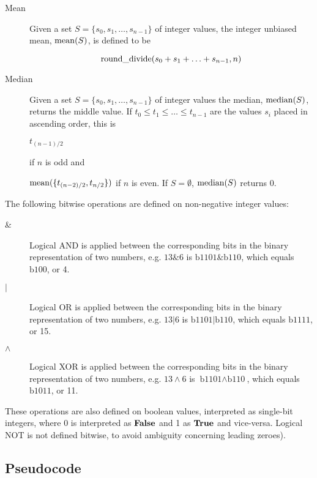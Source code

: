 \begin{description}
\item[Mean] Given a set  $S=\{s_0, s_1, \hdots, s_{n-1}\}$ of integer values, the integer unbiased mean, $\operatorname{mean}(S)$, is defined
to be

\[\operatorname{round\_divide}(s_0+s_1+\hdots +s_{n-1},n)\]

\item[Median] Given a set $S=\{s_0, s_1, \hdots, s_{n-1} \}$ of integer values the median, $\operatorname{median}(S)$, 
returns the middle value. If $t_0\leq t_1\leq \hdots \leq t_{n-1}$ are the values $s_i$ placed in ascending order, this
is 

$t_{(n-1)/2}$ 

if $n$ is odd and

$\operatorname{mean}(\{ t_{(n-2)/2},t_{n/2}\})$ if $n$ is even. If $S=\emptyset$, $\operatorname{median}(S)$ returns 0.
\end{description}
The following bitwise operations are defined on non-negative integer values:
\begin{description}
\item[\&] Logical AND is applied between the corresponding bits in the binary representation of two numbers, e.g.
$13\&6$ is $\text{b1101}\&\text{b110}$, which equals $\text{b100}$, or 4.

\item[${\mathbf |}$] Logical OR is applied between the corresponding bits in the binary representation of two numbers, e.g.
$13|6$ is $\text{b1101}\text{|}\text{b110}$, which equals $\text{b1111}$, or 15.

\item[${\mathbf \wedge}$] Logical XOR is applied between the corresponding bits in the binary representation of two numbers, e.g.
$13\wedge 6$ is $\text{b1101}\wedge\text{b110}$, which equals $\text{b1011}$, or 11.
\begin{comment}
\item[!] Logical NOT is applied to all bits in the representation of a number e.g. $!(b010)=b101$.
\end{comment}
\end{description}
These operations are also defined on boolean values, interpreted as single-bit integers, 
where 0 is interpreted as $\text{\bf{False}}$ and 1 as $\text{\bf{True}}$ and vice-versa. Logical NOT is 
not defined bitwise, to avoid ambiguity concerning leading zeroes).

\subsection{Pseudocode}
\label{pseudocode}

